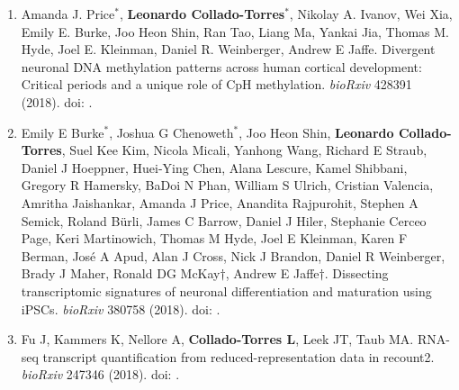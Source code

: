 \begin{enumerate}
        \item Amanda J. Price$^{*}$, \textbf{Leonardo Collado-Torres}$^{*}$, Nikolay A. Ivanov, Wei Xia, Emily E. Burke, Joo Heon Shin, Ran Tao, Liang Ma, Yankai Jia, Thomas M. Hyde, Joel E. Kleinman, Daniel R. Weinberger, Andrew E Jaffe. Divergent neuronal DNA methylation patterns across human cortical development: Critical periods and a unique role of CpH methylation. \emph{bioRxiv} 428391 (2018). doi: .
        
        \item Emily E Burke$^{*}$, Joshua G Chenoweth$^{*}$, Joo Heon Shin, \textbf{Leonardo Collado-Torres}, Suel Kee Kim, Nicola Micali, Yanhong Wang, Richard E Straub, Daniel J Hoeppner, Huei-Ying Chen, Alana Lescure, Kamel Shibbani, Gregory R Hamersky, BaDoi N Phan, William S Ulrich, Cristian Valencia, Amritha Jaishankar, Amanda J Price, Anandita Rajpurohit, Stephen A Semick, Roland Bürli, James C Barrow, Daniel J Hiler, Stephanie Cerceo Page, Keri Martinowich, Thomas M Hyde, Joel E Kleinman, Karen F Berman, José A Apud, Alan J Cross, Nick J Brandon, Daniel R Weinberger, Brady J Maher, Ronald DG McKay$\dagger$, Andrew E Jaffe$\dagger$. Dissecting transcriptomic signatures of neuronal differentiation and maturation using iPSCs. \emph{bioRxiv} 380758 (2018). doi: .
        
        \item Fu J, Kammers K, Nellore A, \textbf{Collado-Torres L}, Leek JT, Taub MA. RNA-seq transcript quantification from reduced-representation data in recount2. \emph{bioRxiv} 247346 (2018). doi: .
    \end{enumerate}

